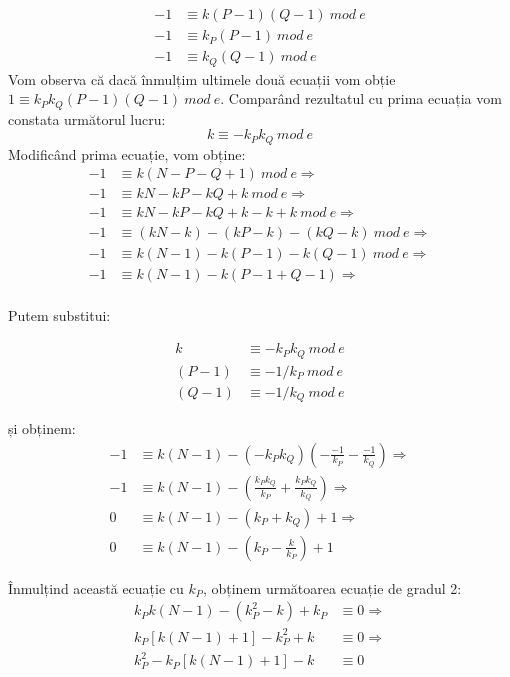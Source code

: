 \documentclass[12]{report}
\begin{document}
\begin{equation}
\begin{split}
-1 &\equiv k(P-1)(Q-1) \ mod \ e \\
-1 &\equiv k_P(P-1) \ mod \ e \\
-1 &\equiv k_Q(Q-1) \ mod \ e
\end{split}
\end{equation}
Vom observa că dacă înmulțim ultimele două ecuații vom obție $ 1 \equiv k_Pk_Q(P-1)(Q-1) \ mod \ e$. Comparând rezultatul cu prima ecuația vom constata următorul lucru:
$$ k \equiv -k_Pk_Q \ mod \ e $$
Modificând prima ecuație, vom obține:
\begin{align*}
 -1 &\equiv k(N-P-Q+1) \ mod \ e \Rightarrow \\
 -1 &\equiv kN - kP - kQ +k \ mod \ e \Rightarrow \\
 -1 &\equiv kN-kP-kQ + k - k + k \ mod \ e \Rightarrow \\
 -1 &\equiv (kN-k) - (kP - k ) - (kQ - k ) \ mod \ e \Rightarrow \\
 -1 &\equiv k(N-1) -k(P-1) - k(Q-1) \ mod \ e  \Rightarrow \\
 -1 &\equiv k(N-1) -k(P-1+Q-1) \Rightarrow \\
\end{align*}


Putem substitui:

\begin{align*}
k &\equiv -k_P k_Q \ mod \ e \\
(P-1) &\equiv -1/k_P \ mod \ e \\
(Q-1) &\equiv -1/k_Q \ mod \ e
\end{align*}

și obținem:
\begin{align*}
-1 &\equiv k(N-1) -(-k_Pk_Q)(-\frac{-1}{k_P} - \frac{-1}{k_Q}) \Rightarrow  \\
-1 &\equiv k(N-1) - (\frac{k_Pk_Q}{k_P} + \frac{k_Pk_Q}{k_Q}) \Rightarrow  \\
0  &\equiv  k(N-1) - (k_P + k_Q) +1 \Rightarrow \\
0  &\equiv k(N-1) - (k_P - \frac{k}{k_P}) +1
\end{align*}


Înmulțind această ecuație cu $k_P$, obținem următoarea ecuație de gradul 2:
\begin{align*}
k_Pk(N-1) - (k_{P}^{2} - k) +k_P &\equiv 0 \Rightarrow \\
k_P[k(N-1)+1] - k_{P}^{2} + k &\equiv 0 \Rightarrow \\
k_{P}^{2} - k_P[k(N-1)+1] - k &\equiv 0
\end{align*}
\end{document}
